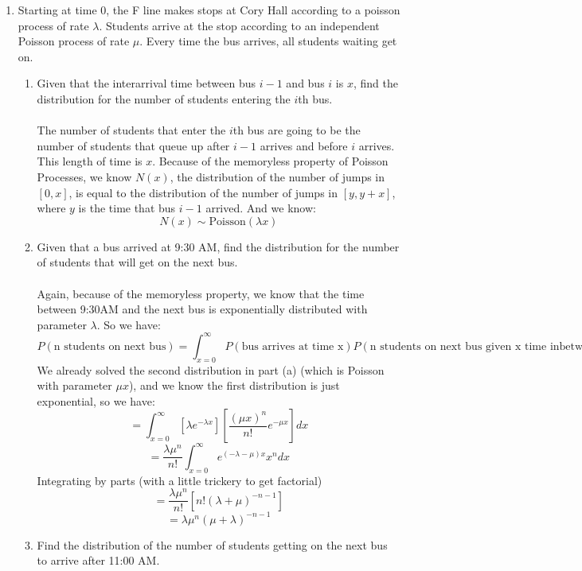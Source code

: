 \begin{enumerate}
\begin{enumerate}
        
    \end{enumerate}
  \item Starting at time 0, the F line makes stops at Cory Hall according to a poisson process of rate $\lambda$. Students arrive at the stop according to an independent Poisson process of rate $\mu$. Every time the bus arrives, all students waiting get on.
    \begin{enumerate}
      \item Given that the interarrival time between bus $i-1$ and bus $i$ is $x$, find the distribution for the number of students entering the $i$th bus.\\\\

        The number of students that enter the $i$th bus are going to be the number of students that queue up after $i-1$ arrives and before $i$ arrives. This length of time is $x$. Because of the memoryless property of Poisson Processes, we know $N(x)$, the distribution of the number of jumps in $[0,x]$, is equal to the distribution of the number of jumps in $[y, y+x]$, where $y$ is the time that bus $i-1$ arrived. And we know:
        $$N(x) \sim \text{Poisson}(\lambda x)$$
      \item Given that a bus arrived at 9:30 AM, find the distribution for the number of students that will get on the next bus.\\\\

        Again, because of the memoryless property, we know that the time between 9:30AM and the next bus is exponentially distributed with parameter $\lambda$. So we have:
        $$P(\text{n students on next bus}) = \int_{x=0}^\infty P(\text{bus arrives at time x})P(\text{n students on next bus given x time inbetween}) dx$$
        We already solved the second distribution in part (a) (which is Poisson with parameter $\mu x$), and we know the first distribution is just exponential, so we have:
        $$=\int_{x=0}^\infty [\lambda e^{- \lambda x}][\frac{(\mu x)^n}{n!} e^{- \mu x}] dx$$
        $$=\frac{\lambda \mu^n}{n!} \int_{x=0}^\infty e^{(-\lambda - \mu)x} x^n dx$$
        Integrating by parts (with a little trickery to get factorial)
        $$=\frac{\lambda \mu^n}{n!} [n! (\lambda + \mu)^{-n-1}]$$
        $$=\lambda \mu^n (\mu + \lambda)^{-n-1}$$
      \item Find the distribution of the number of students getting on the next bus to arrive after 11:00 AM.\\\\


\end{enumerate}
\end{enumerate}
